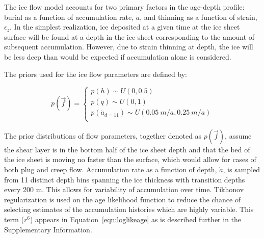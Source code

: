 The ice flow model accounts for two primary factors in the age-depth profile: burial as a function of accumulation rate, $\dot{a}$, and thinning as a function of strain, $\epsilon_z$. In the simplest realization, ice deposited at a given time at the ice sheet surface will be found at a depth in the ice sheet corresponding to the amount of subsequent accumulation. However, due to strain thinning at depth, the ice will be less deep than would be expected if accumulation alone is considered. 


The priors used for the ice flow parameters are defined by:

\begin{center}
\begin{equation}\label{priors}
p(\vec{f}) = 
\begin{cases}
p(h) \sim U(0, 0.5) \\
p(q) \sim U (0, 1) \\
p(\dot{a}_{d=11}) \sim U(0.05~m/a,0.25~m/a)\\
\end{cases}	
\end{equation}	
\end{center}

The prior distributions of flow parameters, together denoted as $p(\vec{f})$, assume the shear layer is in the bottom half of the ice sheet depth \citep{cuffey2010} and that the bed of the ice sheet is moving no faster than the surface, which would allow for cases of both plug and creep flow. Accumulation rate as a function of depth, $\dot{a}$, is sampled from 11 distinct depth bins spanning the ice thickness with transition depths every 200 m. This allows for variability of accumulation over time. Tikhonov regularization is used on the age likelihood function to reduce the chance of selecting estimates of the accumulation histories which are highly variable. This term ($r^6$) appears in Equation~\ref{eqn:loglikeage} as is described further in the Supplementary Information.
